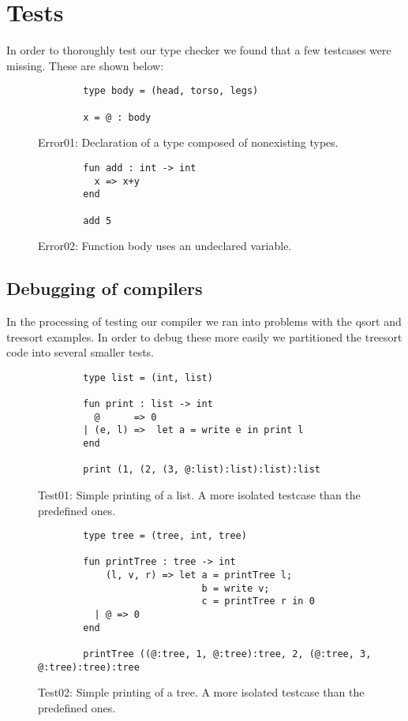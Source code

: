 \chapter{Tests}
In order to thoroughly test our type checker we found that a few testcases
were missing. These are shown below:

\begin{figure}
    \centering
    \begin{lstlisting}
        type body = (head, torso, legs)

        x = @ : body
    \end{lstlisting}
    \label{fig:tests:error01}
    \caption{Error01: Declaration of a type composed of nonexisting types.}
\end{figure}

\begin{figure}
    \centering
    \begin{lstlisting}
        fun add : int -> int
          x => x+y
        end

        add 5
    \end{lstlisting}
    \label{fig:tests:error02}
    \caption{Error02: Function body uses an undeclared variable.}
\end{figure}


\section{Debugging of compilers}
In the processing of testing our compiler we ran into problems with the qsort
and treesort examples. In order to debug these more easily we partitioned the
treesort code into several smaller tests.

\begin{figure}
    \centering
    \begin{lstlisting}
        type list = (int, list)

        fun print : list -> int
          @      => 0
        | (e, l) =>  let a = write e in print l
        end

        print (1, (2, (3, @:list):list):list):list
    \end{lstlisting}
    \label{fig:tests:test01}
    \caption{Test01: Simple printing of a list. A more isolated testcase than
             the predefined ones.}
\end{figure}

\begin{figure}
    \centering
    \begin{lstlisting}
        type tree = (tree, int, tree)

        fun printTree : tree -> int
            (l, v, r) => let a = printTree l;
                             b = write v;
                             c = printTree r in 0
          | @ => 0
        end

        printTree ((@:tree, 1, @:tree):tree, 2, (@:tree, 3, @:tree):tree):tree
    \end{lstlisting}
    \label{fig:tests:test02}
    \caption{Test02: Simple printing of a tree. A more isolated testcase than
             the predefined ones.}
\end{figure}

